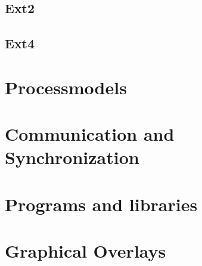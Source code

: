 \documentclass[main.tex,fontsize=8pt,paper=a4,paper=portrait,DIV=calc,]{scrartcl}
\begin{document}
\subsection{Ext2}

\subsection{Ext4}

\section{Processmodels}

\section{Communication and Synchronization}

\section{Programs and libraries}

\section{Graphical Overlays}
\end{document}
